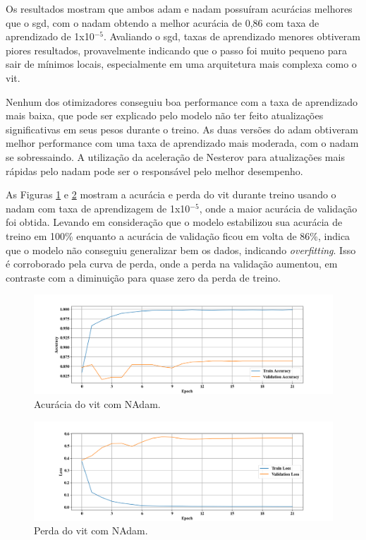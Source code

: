 Os resultados mostram que ambos \acrshort{adam} e \acrshort{nadam} possuíram acurácias melhores que o \acrshort{sgd}, com o \acrshort{nadam} obtendo a melhor acurácia de 0,86 com taxa de aprendizado de 1x10$^{-5}$.
Avaliando o \acrshort{sgd}, taxas de aprendizado menores obtiveram piores resultados, provavelmente indicando que o passo foi muito pequeno para sair de mínimos locais, especialmente em uma arquitetura mais complexa como o \acrshort{vit}. 

Nenhum dos otimizadores conseguiu boa performance com a taxa de aprendizado mais baixa, 
que pode ser explicado pelo modelo não ter feito atualizações significativas em seus pesos durante o treino.
As duas versões do \acrshort{adam} obtiveram melhor performance com uma taxa de aprendizado mais moderada, com o \acrshort{nadam} se sobressaindo. 
A utilização da aceleração de Nesterov para atualizações mais rápidas pelo \acrshort{nadam} pode ser o responsável pelo melhor desempenho.

As Figuras \ref{fig:nadam_acc} e \ref{fig:nadam_loss} mostram a acurácia e perda do \acrshort{vit} durante treino 
usando o \acrshort{nadam} com taxa de aprendizagem de 1x10$^{-5}$, onde a maior acurácia de validação foi obtida.
Levando em consideração que o modelo estabilizou sua acurácia de treino em 100\% enquanto a acurácia de validação ficou em volta de 86\%,
indica que o modelo não conseguiu generalizar bem os dados, indicando \textit{overfitting}.
Isso é corroborado pela curva de perda, onde a perda na validação aumentou, em contraste com a diminuição para quase zero da perda de treino.

\begin{figure}[tb]
\centerline{\includegraphics[width=1\linewidth]{images/resultados/nadam_accuracy.png}}
\caption{Acurácia do \acrshort{vit} com NAdam.}
\label{fig:nadam_acc}
\end{figure}

\begin{figure}[tb]
\centerline{\includegraphics[width=1\linewidth]{images/resultados/nadam_loss.png}}
\caption{Perda do \acrshort{vit} com NAdam.}
\label{fig:nadam_loss}
\end{figure}


